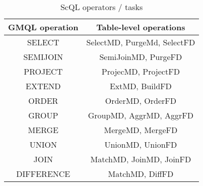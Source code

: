 \begin{table}
\centering
\caption{ScQL operators / tasks}
\label{table:scql}
\begin{centering}
\begin{tabular}{|c|c|}
\hline
\multicolumn{1}{|c|}{GMQL operation}&  \multicolumn{1}{|c|}{Table-level operations} \\ \hline\hline
SELECT & SelectMD, PurgeMd, SelectFD \\\hline
SEMIJOIN & SemiJoinMD, PurgeFD \\\hline
PROJECT & ProjecMD, ProjectFD \\\hline
EXTEND & ExtMD, BuildFD \\\hline
ORDER & OrderMD, OrderFD \\\hline
GROUP & GroupMD, AggrMD, AggrFD \\\hline
MERGE & MergeMD, MergeFD \\\hline
UNION & UnionMD, UnionFD \\\hline
JOIN & MatchMD, JoinMD, JoinFD \\\hline
DIFFERENCE & MatchMD, DiffFD \\\hline
\end{tabular}
\end{centering}
\end{table}


\centering
\caption{SciQL-MAP - Single Machine (SM)}
\label{tab:map-sm}

